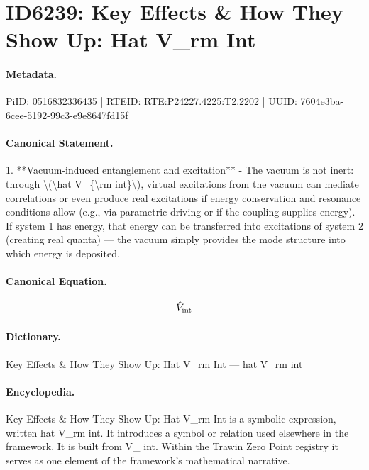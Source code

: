 \section*{ID6239: Key Effects \& How They Show Up: Hat V\_rm Int}
\paragraph{Metadata.}
PiID: 0516832336435 | RTEID: RTE:P24227.4225:T2.2202 | UUID: 7604e3ba-6cee-5192-99c3-e9e8647fd15f

\paragraph{Canonical Statement.}
1. **Vacuum-induced entanglement and excitation** - The vacuum is not inert: through \textbackslash{}(\textbackslash{}hat V\_\{\textbackslash{}rm int\}\textbackslash{}), virtual excitations from the vacuum can mediate correlations or even produce real excitations if energy conservation and resonance conditions allow (e.g., via parametric driving or if the coupling supplies energy). - If system 1 has energy, that energy can be transferred into excitations of system 2 (creating real quanta) — the vacuum simply provides the mode structure into which energy is deposited.

\paragraph{Canonical Equation.}
\[
\hat V_{\rm int}
\]

\paragraph{Dictionary.}
Key Effects \& How They Show Up: Hat V\_rm Int — hat V\_rm int

\paragraph{Encyclopedia.}
Key Effects \& How They Show Up: Hat V\_rm Int is a symbolic expression, written hat V\_rm int. It introduces a symbol or relation used elsewhere in the framework. It is built from V\_ int. Within the Trawin Zero Point registry it serves as one element of the framework's mathematical narrative.
